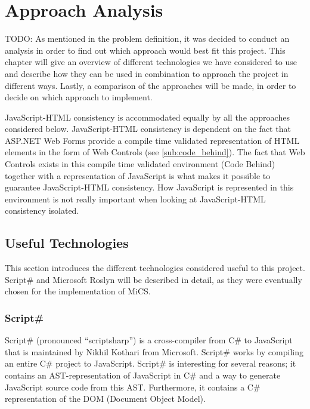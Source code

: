 \chapter{Approach Analysis}
	TODO: As mentioned in the problem definition, it was decided to conduct an analysis in order to find out which approach would best fit this project. This chapter will give an overview of different technologies we have considered to use and describe how they can be used in combination to approach the project in different ways. Lastly, a comparison of the approaches will be made, in order to decide on which approach to implement.

	JavaScript-HTML consistency is accommodated equally by all the approaches considered below. JavaScript-HTML consistency is dependent on the fact that ASP.NET Web Forms provide a compile time validated representation of HTML elements in the form of Web Controls (see \ref{sub:code_behind}). The fact that Web Controls exists in this compile time validated environment (Code Behind) together with a representation of JavaScript is what makes it possible to guarantee JavaScript-HTML consistency. How JavaScript is represented in this environment is not really important when looking at JavaScript-HTML consistency isolated.

\section{Useful Technologies}
	\label{sec:useful_technologies}
	This section introduces the different technologies considered useful to this project. Script\# and Microsoft Roslyn will be described in detail, as they were eventually chosen for the implementation of MiCS.

	

	\subsection{Script\#} %
	\label{sub:subsection_scriptsharp}
		Script\# (pronounced ``scriptsharp'') \cite{scriptsharp} is a cross-compiler from C\# to JavaScript that is maintained by Nikhil Kothari \cite{nikhilk} from Microsoft. Script\# works by compiling an entire C\# project to JavaScript. Script\# is interesting for several reasons; it contains an AST-representation of JavaScript in C\# and a way to generate JavaScript source code from this AST. Furthermore, it contains a C\# representation of the DOM (Document Object Model).

